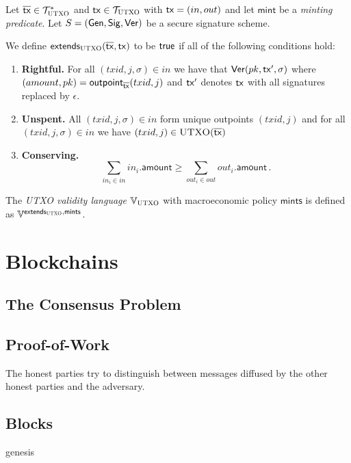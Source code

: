 \begin{definition}
  Let $\overline{\mathsf{tx}} \in \mathcal{T}_{\textsc{UTXO}}^*$ and $\mathsf{tx} \in \mathcal{T}_{\textsc{UTXO}}$ with
  $\mathsf{tx} = (in, out)$ and let $\textsf{mint}$ be a \emph{minting predicate}.
  Let $S = (\mathsf{Gen}, \mathsf{Sig}, \mathsf{Ver})$ be a secure signature scheme.

  We define $\textsf{extends}_{\textsc{UTXO}}(\overline{\mathsf{tx}}, \mathsf{tx})$ to be $\textsf{true}$
  if all of the following conditions hold:

  \begin{enumerate}
    \item \textbf{Rightful.}
          For all $(txid, j, \sigma) \in in$ we have that
          $\mathsf{Ver}(pk, \mathsf{tx}', \sigma)$ where
          $(amount, pk) = \textsf{outpoint}_{\overline{\mathsf{tx}}}(txid, j)$
          and $\mathsf{tx}'$ denotes $\mathsf{tx}$ with all signatures replaced by $\epsilon$.
    \item \textbf{Unspent.}
          All $(txid, j, \sigma) \in in$ form unique outpoints $(txid, j)$ and
          for all $(txid, j, \sigma) \in in$ we have
          $(txid, j) \in \textsc{UTXO}(\overline{\mathsf{tx}})$
    \item \textbf{Conserving.}
          \[\sum_{in_i \in in} in_i.\textsf{amount} \geq \sum_{out_i \in out} out_i.\textsf{amount}\,.\]
  \end{enumerate}

  The \emph{UTXO validity language} $\mathbb{V}_{\textsc{UTXO}}$ with macroeconomic
  policy $\textsf{mints}$ is defined as
  $\mathbb{V}^{\textsf{extends}_{\textsc{UTXO}},\textsf{mints}}$.
\end{definition}

\section{Blockchains}
\subsection{The Consensus Problem}
\subsection{Proof-of-Work}
\cite{pow}
The
honest parties try to distinguish between messages diffused by the other honest
parties and the adversary.

\subsection{Blocks}
genesis

